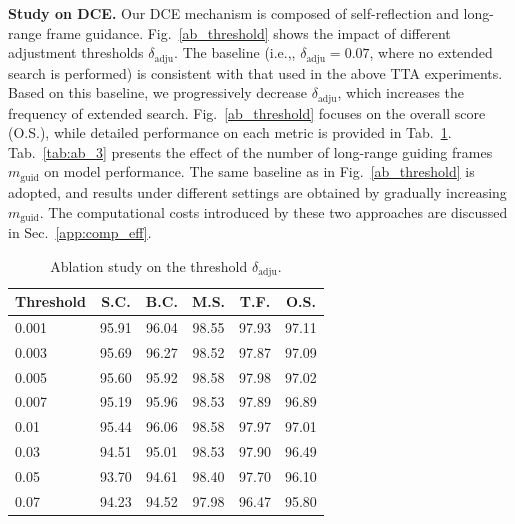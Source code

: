 \documentclass{llmxive}
\providecommand{\ie}{i.e.,\xspace}
\begin{document}
\textbf{Study on DCE.}
Our DCE mechanism is composed of self-reflection and long-range frame guidance.
Fig.~\ref{ab_threshold} shows the impact of different adjustment thresholds $\delta_{\mathrm{adju}}$. The baseline (\ie, $\delta_{\mathrm{adju}}=0.07$, where no extended search is performed) is consistent with that used in the above TTA experiments.
Based on this baseline, we progressively decrease $\delta_{\mathrm{adju}}$, which increases the frequency of extended search. Fig.~\ref{ab_threshold} focuses on the overall score (O.S.), while detailed performance on each metric is provided in Tab.~\ref{app:tab_2}.
Tab.~\ref{tab:ab_3} presents the effect of the number of long-range guiding frames $m_{\mathrm{guid}}$ on model performance. The same baseline as in Fig.~\ref{ab_threshold} is adopted, and results under different settings are obtained by gradually increasing $m_{\mathrm{guid}}$.
The computational costs introduced by these two approaches are discussed in Sec.~\ref{app:comp_eff}.


\begin{table}[htbp]
    \centering
    \small
    \begin{tabular}{lccccc} 
        \toprule
        \textbf{Threshold} & \textbf{S.C.} & \textbf{B.C.} & \textbf{M.S.} & \textbf{T.F.} & \textbf{O.S.} \\
        \midrule
        0.001 & 95.91 & 96.04 & 98.55 & 97.93 & 97.11 \\
        0.003 & 95.69 & 96.27 & 98.52 & 97.87 & 97.09 \\
        0.005 & 95.60 & 95.92 & 98.58 & 97.98 & 97.02 \\
        0.007 & 95.19 & 95.96 & 98.53 & 97.89 & 96.89 \\
        0.01  & 95.44 & 96.06 & 98.58 & 97.97 & 97.01 \\
        0.03  & 94.51 & 95.01 & 98.53 & 97.90 & 96.49 \\
        0.05  & 93.70 & 94.61 & 98.40 & 97.70 & 96.10 \\
        0.07  & 94.23 & 94.52 & 97.98 & 96.47 & 95.80 \\
        \bottomrule
    \end{tabular}
\caption{Ablation study on the threshold $\delta_\mathrm{adju}$.}
\label{app:tab_2}
\end{table}
\end{document}
